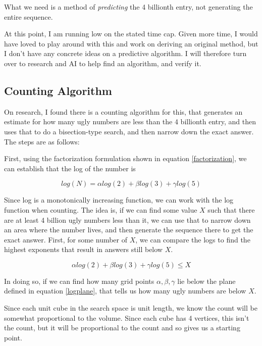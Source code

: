 \documentclass{article}
\begin{document}
What we need is a method of \textit{predicting} the 4 billionth entry, not generating the entire sequence. \newline

At this point, I am running low on the stated time cap. Given more time, I would have loved to play around with this and work on deriving an original method, but I don't have any concrete ideas on a predictive algorithm. I will therefore turn over to research and AI to help find an algorithm, and verify it.

\newpage

\subsection{Counting Algorithm}

On research, I found there is a counting algorithm for this, that generates an estimate for how many ugly numbers are less than the 4 billionth entry, and then uses that to do a bisection-type search, and then narrow down the exact answer. The steps are as follows: \newline

First, using the factorization formulation shown in equation \ref{factorization}, we can establish that the log of the number is

\begin{equation}
    log(N) = \alpha log(2) + \beta log(3) + \gamma log(5)
    \label{logformulation}
\end{equation}

Since log is a monotonically increasing function, we can work with the log function when counting. The idea is, if we can find some value $X$ such that there are at least 4 billion ugly numbers less than it, we can use that to narrow down an area where the number lives, and then generate the sequence there to get the exact answer. First, for some number of $X$, we can compare the logs to find the highest exponents that result in answers still below $X$. 

\begin{equation}
    \alpha log(2) + \beta log(3) + \gamma log(5) \leq X
    \label{logplane}
\end{equation}

In doing so, if we can find how many grid points $\alpha,\beta,\gamma$ lie below the plane defined in equation \ref{logplane}, that tells us how many ugly numbers are below $X$. \newline

Since each unit cube in the search space is unit length, we know the count will be somewhat proportional to the volume. Since each cube has 4 vertices, this isn't the count, but it will be proportional to the count and so gives us a starting point. \newline
\end{document}
